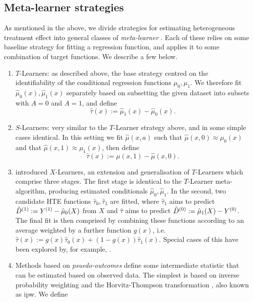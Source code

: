 \documentclass[../thesis.tex]{subfiles}
\begin{document}
\subsection{Meta-learner strategies}
As mentioned in the above, we divide strategies for estimating heterogeneous treatment effect into general classes of \emph{meta-learner} \citep{kunzel_metalearners_2019, curth_nonparametric_2021}. Each of these relies on some baseline strategy for fitting a regression function, and applies it to some combination of target functions. We describe a few below.

\begin{enumerate}
    \item \label{tech:tlearner} $T$-Learners: as described above, the base strategy centred on the identifiability of the conditional regression functions $\mu_0, \mu_1$. We therefore fit $\hat{\mu}_0(x), \hat{\mu}_1(x)$ separately based on subsetting the given dataset into subsets with $A=0$ and $A=1$, and define 
    \[ \hat{\tau}(x) := \hat{\mu}_1(x) - \hat{\mu}_0(x).\]
    \item $S$-Learners: very similar to the $T$-Learner strategy above, and in some simple cases identical. In this setting we fit $\hat{\mu}(x,a)$ such that $\hat{\mu}(x,0) \approx \mu_0(x)$ and that $\hat{\mu}(x, 1) \approx \mu_1(x)$, then define
    \[\hat{\tau}(x) := \hat{\mu}(x,1) - \hat{\mu}(x,0).\]
    \item \citet{kunzel_metalearners_2019} introduced $X$-Learners, an extension and generalisation of $T$-Learners which comprise three stages. The first stage is identical to the $T$-Learner meta-algorithm, producing estimated conditionals $\hat{\mu}_0, \hat{\mu}_1$. In the second, two candidate HTE functions $\hat{\tau}_0, \hat{\tau}_1$ are fitted, where $\hat{\tau}_1$ aims to predict $\Tilde{D}^{(1)} := Y^{(1)} - \hat{\mu}_0(X)$ from $X$ and $\hat{\tau}$ aims to predict $\Tilde{D}^{(0)} := \hat{\mu}_1(X) - Y^{(0)}$. The final fit is then comprised by combining these functions according to an average weighted by a further function $g(x)$, i.e. $\hat{\tau}(x) := g(x)\hat{\tau}_0(x) + (1-g(x))\hat{\tau}_1(x)$. Special cases of this have been explored by, for example, \citet{curth_nonparametric_2021}.
    \item \label{tech:ipw} Methods based on \emph{psuedo-outcomes} define some intermediate statistic that can be estimated based on observed data. The simplest is based on inverse probability weighting and the Horvitz-Thompson transformation \citep{horvitz_generalization_1952}, also known as \gls{ipw}. We define 

\end{enumerate}
\end{document}
